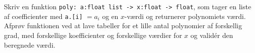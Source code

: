 Skriv en funktion \lstinline{poly: a:float list -> x:float -> float}, som tager en liste af coefficienter med \lstinline{a.[i]} $= a_i$ og en $x$-værdi og returnerer polynomiets værdi. Afprøv funktionen ved at lave tabeller for et lille antal polynomier af forskellig grad, med forskellige koefficienter og forskellige værdier for $x$ og valid\'{e}r den beregnede værdi.